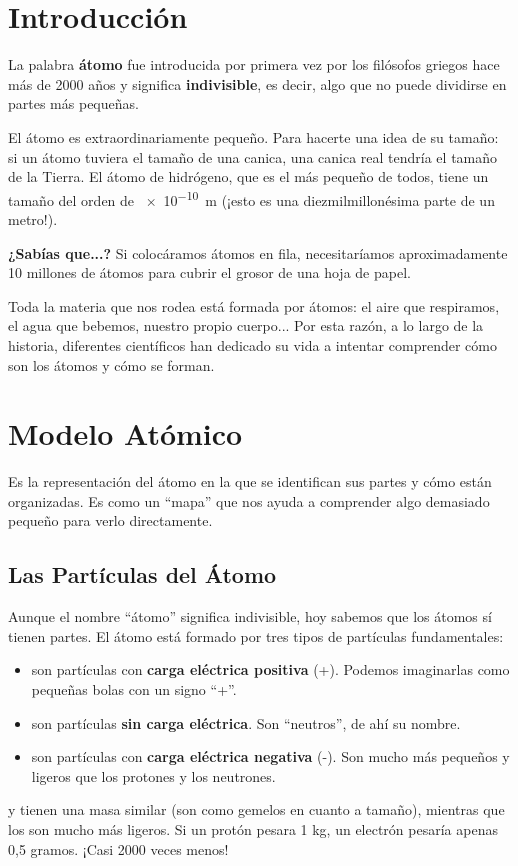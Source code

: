 
\section{Introducción}
La palabra \textbf{átomo} fue introducida por primera vez por los filósofos griegos hace más de 2000 años y significa \textbf{indivisible}, es decir, algo que no puede dividirse en partes más pequeñas.

El átomo es extraordinariamente pequeño. Para hacerte una idea de su tamaño: si un átomo tuviera el tamaño de una canica, una canica real tendría el tamaño de la Tierra. El átomo de hidrógeno, que es el más pequeño de todos, tiene un tamaño del orden de \qty{e-10}{\metre} (¡esto es una diezmilmillonésima parte de un metro!).
\begin{remark}
    \textbf{¿Sabías que...?} Si colocáramos átomos en fila, necesitaríamos aproximadamente 10 millones de átomos para cubrir el grosor de una hoja de papel.
\end{remark}
Toda la materia que nos rodea está formada por átomos: el aire que respiramos, el agua que bebemos, nuestro propio cuerpo... Por esta razón, a lo largo de la historia, diferentes científicos han dedicado su vida a intentar comprender cómo son los átomos y cómo se forman.
\section{Modelo Atómico}
\begin{definition}
    Es la representación del átomo en la que se identifican sus partes y cómo están organizadas. Es como un ``mapa'' que nos ayuda a comprender algo demasiado pequeño para verlo directamente.
\end{definition}
\subsection{Las Partículas del Átomo}

Aunque el nombre ``átomo'' significa indivisible, hoy sabemos que los átomos sí tienen partes. El átomo está formado por tres tipos de partículas fundamentales:
\begin{itemize}
    \item {} son partículas con \textbf{carga eléctrica positiva} (+). Podemos imaginarlas como pequeñas bolas con un signo ``+''.
    \item {} son partículas \textbf{sin carga eléctrica}. Son ``neutros'', de ahí su nombre.
    \item {} son partículas con \textbf{carga eléctrica negativa} (-). Son mucho más pequeños y ligeros que los protones y los neutrones.
\end{itemize}
\begin{remark}
    \prt{} y \ntr{} tienen una masa similar (son como gemelos en cuanto a tamaño), mientras que los \el{} son mucho más ligeros. Si un protón pesara 1 kg, un electrón pesaría apenas 0,5 gramos. ¡Casi 2000 veces menos!
\end{remark}
